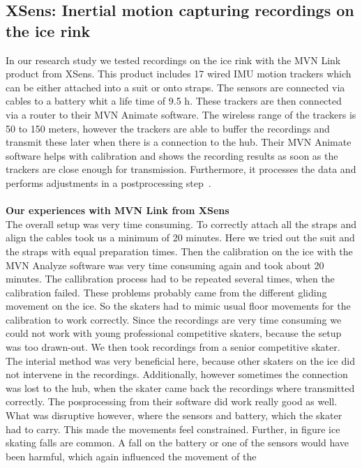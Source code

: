 \subsection{XSens: Inertial motion capturing recordings on the ice rink}
In our research study we tested recordings on the ice rink with the MVN Link product from XSens.
This product includes 17 wired IMU motion trackers which can be either attached into a suit or onto straps.
The sensors are connected via cables to a battery whit a life time of 9.5 h.
These trackers are then connected via a router to their MVN Animate software.
The wireless range of the trackers is 50 to 150 meters, however the trackers are able to buffer the recordings
and transmit these later when there is a connection to the hub.
Their MVN Animate software helps with calibration and shows the recording results as soon as the trackers are close
enough
for transmission.
Furthermore, it processes the data and performs adjustments in a postprocessing step~\cite{xsensmvnanimate}.
\\\mbox{}\\
\textbf{Our experiences with MVN Link from XSens}\mbox{}\\
The overall setup was very time consuming. To correctly attach all the straps and align the cables took us a
minimum of 20 minutes. Here we tried out the suit and the straps with equal preparation times.
Then the calibration on the ice with the MVN Analyze software was very time consuming again and took about 20 minutes.
The callibration process had to be repeated several times, when the calibration failed.
These problems probably came from the different gliding movement on the ice.
So the skaters had to mimic usual floor movements for the calibration to work correctly.
Since the recordings are very time consuming we could not work with young professional competitive skaters, because
the setup was too drawn-out.
We then took recordings from a senior competitive skater. The interial method was very beneficial here, because other
skaters on the ice did not intervene in the recordings. Additionally, however sometimes the connection was lost to
the hub, when the skater came back the recordings where transmitted correctly.
The posprocessing from their software did work really good as well.
What was disruptive however, where the sensors and battery, which the skater had to carry.
This made the movements feel constrained. Further, in figure ice skating falls are common.
A fall on the battery or one of the sensors would have been harmful, which again influenced the movement of the
